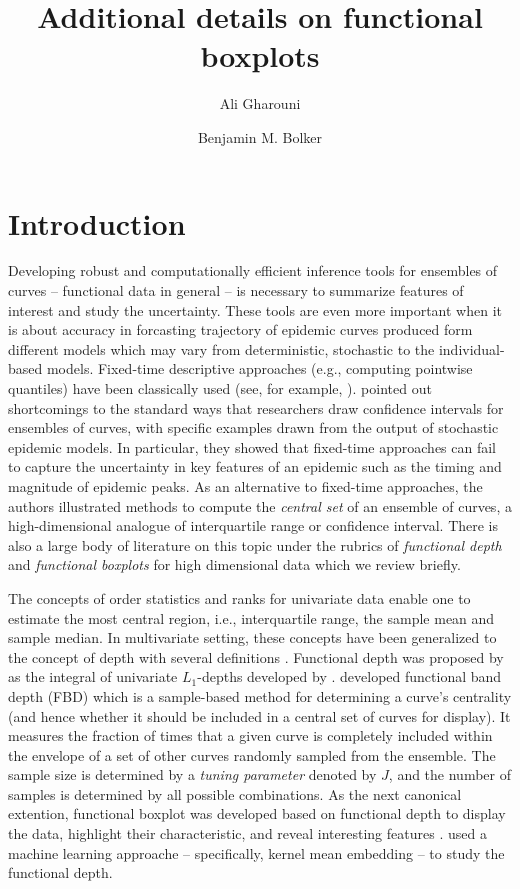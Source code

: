 \documentclass[fleqn,10pt,lineno]{wlpeerj}
\title{Additional details on functional boxplots \ali{a better title?}}
\author[1]{Ali Gharouni}
\author[1,2,3]{Benjamin M. Bolker}
\affil[1]{Department of Mathematics \& Statistics, McMaster University, Hamilton, Canada}
\affil[2]{Department of Biology, McMaster University, Hamilton, Canada}
\affil[3]{Michael G. DeGroote Institute for Infectious Disease Research, McMaster University, Hamilton, Canada}
\begin{document}
\flushbottom
\maketitle
\thispagestyle{empty}

\section*{Introduction}

Developing robust and computationally efficient inference tools for ensembles of curves -- functional data in general -- is necessary to summarize features of interest and study the uncertainty. These tools are even more important when it is about accuracy in forcasting trajectory of epidemic curves produced form different models which may vary from deterministic, stochastic to the individual-based models. Fixed-time descriptive approaches (e.g., computing pointwise quantiles) have been classically used (see, for example, \citep{ferguson2005strategies,chinazzi2020effect}). 
\cite{juul2021fixed} pointed out shortcomings to the standard ways that researchers draw confidence intervals for ensembles of curves, with specific examples drawn from the output of stochastic epidemic models. In particular, they showed that fixed-time approaches can fail to capture the uncertainty in key features of an epidemic such as the timing and magnitude of epidemic peaks. As an alternative to fixed-time approaches, the authors illustrated methods to compute the \emph{central set} of an ensemble of curves, a high-dimensional analogue of interquartile range or confidence interval. There is also a large body of literature on this topic under the rubrics of \emph{functional depth} and \emph{functional boxplots} for high dimensional data which we review briefly.

The concepts of order statistics and ranks for univariate data enable one to estimate the most central region,  i.e., interquartile range, the sample mean and sample median. In multivariate setting, these concepts have been generalized to the concept of depth with several definitions \citep{mahalanobis1936generalized, tukey1975mathematics, oja1983descriptive, liu1990notion, singh1991notion, vardi2000multivariate, zuo2003projection}. Functional depth was proposed by \cite{fraiman2001trimmed} as the integral of univariate $L_1$-depths developed by \cite{vardi2000multivariate}.
\cite{lopez2007depth} developed functional band depth (FBD) which is a sample-based method for determining a curve's centrality (and hence whether it should be included in a central set of curves for display). It measures the fraction of times that a given curve is completely included within the envelope of a set of other curves randomly sampled from the ensemble. The sample size is determined by a \emph{tuning parameter} denoted by $J$, and the number of samples is determined by all possible combinations. As the next canonical extention, functional boxplot was developed based on functional depth to display the data, highlight their characteristic, and reveal interesting features \citep{sun2011functional,sun2012exact}. \cite{wynne2021statistical} used a machine learning approache -- specifically, kernel mean embedding -- to study the functional depth.
\end{document}

